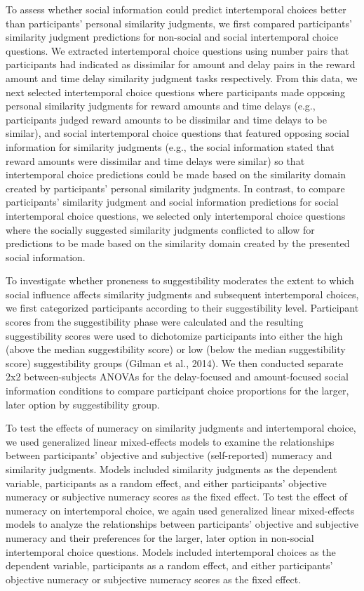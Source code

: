 \documentclass[
  pub,floatsintext]{apa6}
\begin{document}
To assess whether social information could predict intertemporal choices better than participants' personal similarity judgments, we first compared participants' similarity judgment predictions for non-social and social intertemporal choice questions. We extracted intertemporal choice questions using number pairs that participants had indicated as dissimilar for amount and delay pairs in the reward amount and time delay similarity judgment tasks respectively. From this data, we next selected intertemporal choice questions where participants made opposing personal similarity judgments for reward amounts and time delays (e.g., participants judged reward amounts to be dissimilar and time delays to be similar), and social intertemporal choice questions that featured opposing social information for similarity judgments (e.g., the social information stated that reward amounts were dissimilar and time delays were similar) so that intertemporal choice predictions could be made based on the similarity domain created by participants' personal similarity judgments. In contrast, to compare participants' similarity judgment and social information predictions for social intertemporal choice questions, we selected only intertemporal choice questions where the socially suggested similarity judgments conflicted to allow for predictions to be made based on the similarity domain created by the presented social information.

To investigate whether proneness to suggestibility moderates the extent to which social influence affects similarity judgments and subsequent intertemporal choices, we first categorized participants according to their suggestibility level. Participant scores from the suggestibility phase were calculated and the resulting suggestibility scores were used to dichotomize participants into either the high (above the median suggestibility score) or low (below the median suggestibility score) suggestibility groups (Gilman et al., 2014). We then conducted separate 2x2 between-subjects ANOVAs for the delay-focused and amount-focused social information conditions to compare participant choice proportions for the larger, later option by suggestibility group.

To test the effects of numeracy on similarity judgments and intertemporal choice, we used generalized linear mixed-effects models to examine the relationships between participants' objective and subjective (self-reported) numeracy and similarity judgments. Models included similarity judgments as the dependent variable, participants as a random effect, and either participants' objective numeracy or subjective numeracy scores as the fixed effect. To test the effect of numeracy on intertemporal choice, we again used generalized linear mixed-effects models to analyze the relationships between participants' objective and subjective numeracy and their preferences for the larger, later option in non-social intertemporal choice questions. Models included intertemporal choices as the dependent variable, participants as a random effect, and either participants' objective numeracy or subjective numeracy scores as the fixed effect.
\end{document}
